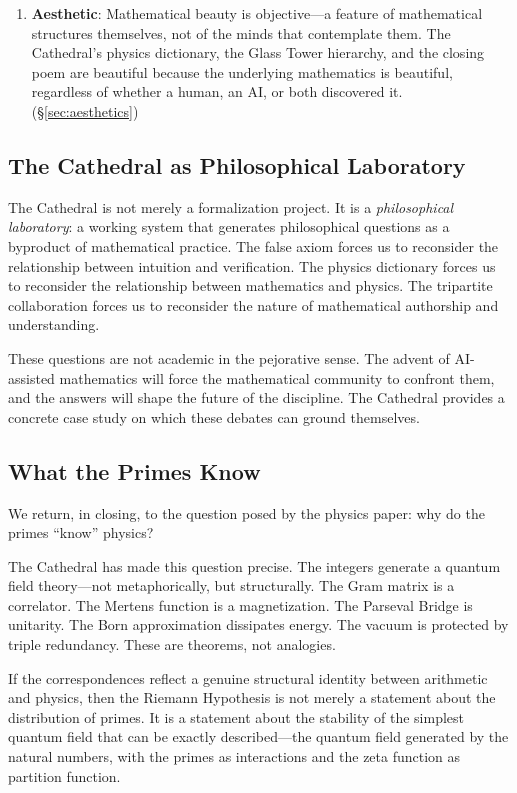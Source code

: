 \begin{enumerate}
  \item \textbf{Aesthetic}: Mathematical beauty is objective---a
    feature of mathematical structures themselves, not of the minds
    that contemplate them. The Cathedral's physics dictionary,
    the Glass Tower hierarchy, and the closing poem are beautiful
    because the underlying mathematics is beautiful, regardless of
    whether a human, an AI, or both discovered it.
    (\S\ref{sec:aesthetics})
\end{enumerate}

\subsection{The Cathedral as Philosophical Laboratory}

The Cathedral is not merely a formalization project. It is a
\emph{philosophical laboratory}: a working system that generates
philosophical questions as a byproduct of mathematical practice.
The false axiom forces us to reconsider the relationship between
intuition and verification. The physics dictionary forces us to
reconsider the relationship between mathematics and physics. The
tripartite collaboration forces us to reconsider the nature of
mathematical authorship and understanding.

These questions are not academic in the pejorative sense. The
advent of AI-assisted mathematics will force the mathematical
community to confront them, and the answers will shape the future
of the discipline. The Cathedral provides a concrete case study
on which these debates can ground themselves.

\subsection{What the Primes Know}

We return, in closing, to the question posed by the physics
paper: why do the primes ``know'' physics?

The Cathedral has made this question precise. The integers
generate a quantum field theory---not metaphorically, but
structurally. The Gram matrix is a correlator. The Mertens
function is a magnetization. The Parseval Bridge is unitarity.
The Born approximation dissipates energy. The vacuum is
protected by triple redundancy. These are theorems, not
analogies.

If the correspondences reflect a genuine structural identity
between arithmetic and physics, then the Riemann Hypothesis
is not merely a statement about the distribution of primes.
It is a statement about the stability of the simplest quantum
field that can be exactly described---the quantum field generated
by the natural numbers, with the primes as interactions and the
zeta function as partition function.

